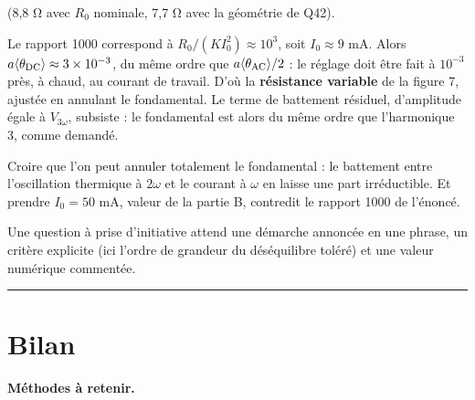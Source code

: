 \documentclass[11pt,a4paper]{article}
\newcommand{\equationajustee}[1]{%
  \sbox{\boiteequation}{$\displaystyle #1$}%
  \ifdim\wd\boiteequation>\linewidth
    \[\resizebox{\linewidth}{!}{\usebox{\boiteequation}}\]%
  \else
    \[#1\]%
  \fi}
\begin{document}
\equationajustee{\boxed{R_{\rm c}=\frac{R_1R_0(1+a\langle\theta_{\rm DC}\rangle)}{R_2}\approx\frac{R_1R_0}{R_2}\approx9\ \Omega}}

(8,8 Ω avec \(R_0\) nominale, 7,7 Ω avec la géométrie de Q42).

Le rapport 1000 correspond à \(R_0/(KI_0^2)\approx10^3\), soit \(I_0\approx9\) mA. Alors \(a\langle\theta_{\rm DC}\rangle\approx3\times10^{-3}\), du même ordre que \(a\langle\theta_{\rm AC}\rangle/2\) : le réglage doit être fait à \(10^{-3}\) près, à chaud, au courant de travail. D'où la \textbf{résistance variable} de la figure 7, ajustée en annulant le fondamental. Le terme de battement résiduel, d'amplitude égale à \(V_{3\omega}\), subsiste : le fondamental est alors du même ordre que l'harmonique 3, comme demandé.

\begin{piege}

Croire que l'on peut annuler totalement le fondamental : le battement entre l'oscillation thermique à \(2\omega\) et le courant à \(\omega\) en laisse une part irréductible. Et prendre \(I_0=50\) mA, valeur de la partie B, contredit le rapport 1000 de l'énoncé.

\end{piege}

\begin{jury}

Une question à prise d'initiative attend une démarche annoncée en une phrase, un critère explicite (ici l'ordre de grandeur du déséquilibre toléré) et une valeur numérique commentée.

\end{jury}

\begin{center}\rule{0.5\linewidth}{0.5pt}\end{center}

\hypertarget{bilan}{%
\section{Bilan}\label{bilan}}

\textbf{Méthodes à retenir.}
\end{document}
